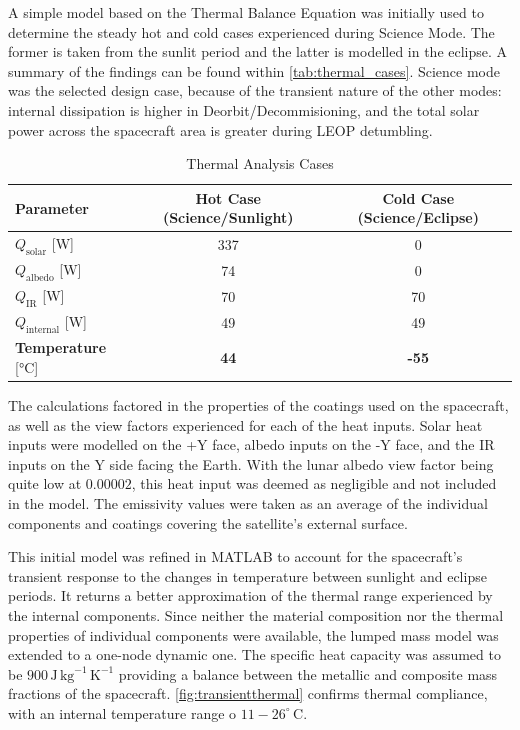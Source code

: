 \documentclass[a4paper, 11pt, conference]{IEEEtran}
\begin{document}
A simple model based on the Thermal Balance Equation was initially used to determine the steady hot and cold cases experienced during Science Mode. The former is taken from the sunlit period and the latter is modelled in the eclipse. A summary of the findings can be found within \autoref{tab:thermal_cases}. Science mode was the selected design case, because of the transient nature of the other modes: internal dissipation is higher in Deorbit/Decommisioning, and
the total solar power across the spacecraft area is greater during LEOP detumbling. 

\begin{table}[H]
\centering
\caption{Thermal Analysis Cases}
\label{tab:thermal_cases}
\begin{tabular}{lSS}
\toprule
\textbf{Parameter} & \textbf{Hot Case (Science/Sunlight)} & \textbf{Cold Case (Science/Eclipse)} \\
\midrule
$Q_{\text{solar}}$ [W] & 337 & 0 \\
$Q_{\text{albedo}}$ [W] & 74 & 0 \\
$Q_{\text{IR}}$ [W] & 70 & 70 \\
$Q_{\text{internal}}$ [W] & 49 & 49 \\
\midrule
\textbf{Temperature} [\si{\degreeCelsius}] & \textbf{44} & \textbf{-55} \\
\bottomrule
\end{tabular}
\end{table}

The calculations factored in the properties of the coatings used on the spacecraft, as well as the view factors experienced for each of the heat inputs. Solar heat inputs were modelled on the +Y face, albedo inputs on the -Y face, and the IR inputs on the Y side facing the Earth. With the lunar albedo view factor being quite low at $0.00002$, this heat input was deemed as negligible and not included in the model. The emissivity values were taken as an average of the individual components and coatings covering the satellite’s external surface. 

This initial model was refined in MATLAB to account for the spacecraft’s transient response to the changes in temperature between sunlight and eclipse periods. It returns a better approximation of the thermal range experienced by the internal components. Since neither the material composition nor the thermal properties of individual components were available, the lumped mass model was extended to a one-node dynamic one. The specific heat capacity was assumed to be $900\,\mathrm{J\,kg}^{-1}\,\mathrm{K}^{-1}$ providing a balance between the metallic and composite mass fractions of the spacecraft. \autoref{fig:transientthermal} confirms thermal compliance, with an internal temperature range o $11-26^\circ\,\mathrm{C}$.
\end{document}

